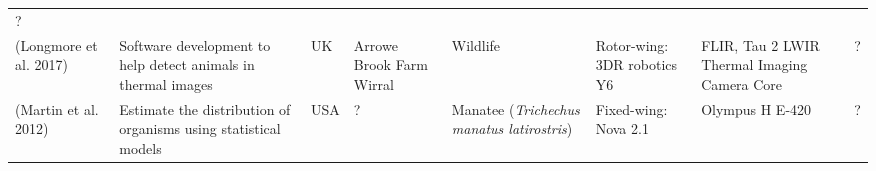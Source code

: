 \documentclass[]{interact}
\theoremstyle{plain}%
\theoremstyle{definition}
\theoremstyle{remark}
\begin{document}
\begin{longtable}[]{@{}llllllll@{}}
\begin{minipage}[t]{0.01\columnwidth}
?\strut
\end{minipage}\tabularnewline
\begin{minipage}[t]{0.11\columnwidth}\raggedright\strut
(Longmore et al. 2017)\strut
\end{minipage} & \begin{minipage}[t]{0.18\columnwidth}\raggedright\strut
Software development to help detect animals in thermal images\strut
\end{minipage} & \begin{minipage}[t]{0.03\columnwidth}\raggedright\strut
UK\strut
\end{minipage} & \begin{minipage}[t]{0.14\columnwidth}\raggedright\strut
Arrowe Brook Farm Wirral\strut
\end{minipage} & \begin{minipage}[t]{0.10\columnwidth}\raggedright\strut
Wildlife\strut
\end{minipage} & \begin{minipage}[t]{0.09\columnwidth}\raggedright\strut
Rotor-wing: 3DR robotics Y6\strut
\end{minipage} & \begin{minipage}[t]{0.11\columnwidth}\raggedright\strut
FLIR, Tau 2 LWIR Thermal Imaging Camera Core\strut
\end{minipage} & \begin{minipage}[t]{0.01\columnwidth}\raggedright\strut
?\strut
\end{minipage}\tabularnewline
\begin{minipage}[t]{0.11\columnwidth}\raggedright\strut
(Martin et al. 2012)\strut
\end{minipage} & \begin{minipage}[t]{0.18\columnwidth}\raggedright\strut
Estimate the distribution of organisms using statistical models\strut
\end{minipage} & \begin{minipage}[t]{0.03\columnwidth}\raggedright\strut
USA\strut
\end{minipage} & \begin{minipage}[t]{0.14\columnwidth}\raggedright\strut
?\strut
\end{minipage} & \begin{minipage}[t]{0.10\columnwidth}\raggedright\strut
Manatee (\emph{Trichechus manatus latirostris})\strut
\end{minipage} & \begin{minipage}[t]{0.09\columnwidth}\raggedright\strut
Fixed-wing: Nova 2.1\strut
\end{minipage} & \begin{minipage}[t]{0.11\columnwidth}\raggedright\strut
Olympus H E-420\strut
\end{minipage} & \begin{minipage}[t]{0.01\columnwidth}\raggedright\strut
?\strut
\end{minipage}\tabularnewline
\bottomrule
\end{longtable}
\end{document}
